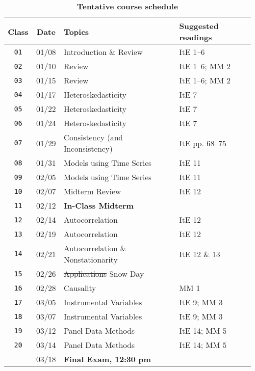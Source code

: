 \documentclass[10pt]{article}
\newcommand{\ra}[1]{\renewcommand{\arraystretch}{#1}}
\begin{document}
\begin{table}[htb]
  \caption*{\textbf{Tentative course schedule}}
  \ra{1.5}
  \begin{tabular}{@{\extracolsep{1cm}} c c l l @{}}
    \toprule
    \textbf{Class} & \textbf{Date} & \textbf{Topics} & \textbf{Suggested readings}  \\ \toprule
    \texttt{01} & 01/08 & Introduction \& Review & ItE 1--6 \\
    \texttt{02} & 01/10 & Review & ItE 1--6; MM 2 \\
    \texttt{03} & 01/15 & Review & ItE 1--6; MM 2 \\
    \texttt{04} & 01/17 & Heteroskedasticity & ItE 7 \\
    \texttt{05} & 01/22 & Heteroskedasticity & ItE 7 \\
    \texttt{06} & 01/24 & Heteroskedasticity & ItE 7 \\
    \texttt{07} & 01/29 & Consistency (and Inconsistency) & ItE pp. 68--75  \\
    \texttt{08} & 01/31 & Models using Time Series & ItE 11  \\
    \texttt{09} & 02/05 & Models using Time Series & ItE 11  \\
    \texttt{10} & 02/07 & Midterm Review & ItE 12 \\ \midrule
    \texttt{11} & 02/12 & \textbf{In-Class Midterm} \\ \midrule
    \texttt{12} & 02/14 & Autocorrelation & ItE 12 \\
    \texttt{13} & 02/19 & Autocorrelation & ItE 12 \\
    \texttt{14} & 02/21 & Autocorrelation \& Nonstationarity & ItE 12 \& 13 \\
    \texttt{15} & 02/26 & \sout{Applications} Snow Day &  \\
    \texttt{16} & 02/28 & Causality & MM 1 \\
    \texttt{17} & 03/05 & Instrumental Variables & ItE 9; MM 3 \\
    \texttt{18} & 03/07 & Instrumental Variables & ItE 9; MM 3 \\
    \texttt{19} & 03/12 & Panel Data Methods & ItE 14; MM 5 \\
    \texttt{20} & 03/14 & Panel Data Methods & ItE 14; MM 5 \\ \midrule
    \texttt{  } & 03/18 & \textbf{Final Exam, 12:30 pm} & \\
    \bottomrule
  \end{tabular}
\end{table}
\end{document}
